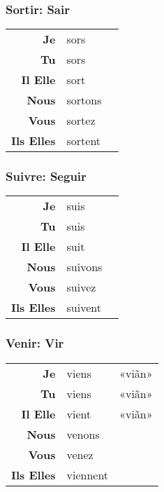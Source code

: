 \documentclass{subfiles}
\begin{document}
\begin{multicols}{3}
        \subsubsection{Sortir: Sair}
            \begin{tabular}{r l r}
                \textbf{Je}        & sors    &\\
                \textbf{Tu}        & sors    &\\
                \textbf{Il Elle}   & sort    &\\
                \textbf{Nous}      & sortons &\\
                \textbf{Vous}      & sortez  &\\
                \textbf{Ils Elles} & sortent &\\
            \end{tabular}

        \subsubsection{Suivre: Seguir}
            \begin{tabular}{r l r}
                \textbf{Je}        & suis    &\\
                \textbf{Tu}        & suis    &\\
                \textbf{Il Elle}   & suit    &\\
                \textbf{Nous}      & suivons &\\
                \textbf{Vous}      & suivez  &\\
                \textbf{Ils Elles} & suivent &
            \end{tabular}

        \subsubsection{Venir: Vir}   
            \begin{tabular}{r l r}
                \textbf{Je}        & viens    & «viãn»\\
                \textbf{Tu}        & viens    & «viãn»\\
                \textbf{Il Elle}   & vient    & «viãn»\\
                \textbf{Nous}      & venons   &\\
                \textbf{Vous}      & venez    &\\
                \textbf{Ils Elles} & viennent &
            \end{tabular}


\end{multicols}
\end{document}
